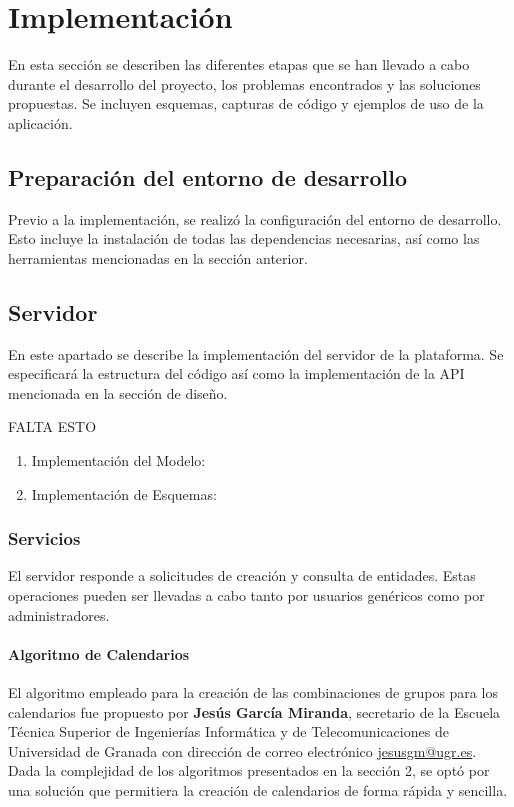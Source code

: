 \chapter{Implementación}

En esta sección se describen las diferentes etapas que se han llevado a cabo durante el desarrollo del proyecto, los problemas encontrados y las soluciones propuestas. Se incluyen esquemas, capturas de código y ejemplos de uso de la aplicación.\newpage

\section{Preparación del entorno de desarrollo}

Previo a la implementación, se realizó la configuración del entorno de desarrollo. Esto incluye la instalación de todas las dependencias necesarias, así como las herramientas mencionadas en la sección anterior.\newline

\section{Servidor}
En este apartado se describe la implementación del servidor de la plataforma. Se especificará la estructura del código así como la implementación de la API mencionada en la sección de diseño.\newline

FALTA ESTO
\begin{enumerate}
    \item Implementación del Modelo:
    \item Implementación de Esquemas:
\end{enumerate}

\subsection{Servicios}

El servidor responde a solicitudes de creación y consulta de entidades. Estas operaciones pueden ser llevadas a cabo tanto por usuarios genéricos como por administradores.

\subsubsection*{Algoritmo de Calendarios}

El algoritmo empleado para la creación de las combinaciones de grupos para los calendarios fue propuesto por \textbf{Jesús García Miranda}, secretario de la Escuela Técnica Superior de Ingenierías Informática y de Telecomunicaciones de Universidad de Granada con dirección de correo electrónico \href{mailto:jesusgm@ugr.es}{jesusgm@ugr.es}. Dada la complejidad de los algoritmos presentados en la sección 2, se optó por una solución que permitiera la creación de calendarios de forma rápida y sencilla.\newline

